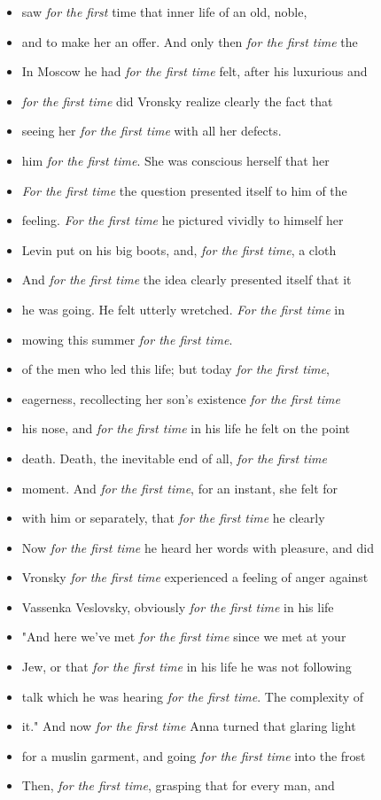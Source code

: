 \begin{tiny}
\begin{itemize}
\item saw \emph{for the first} time that inner life of an old, noble,
\item and to make her an offer.  And only then \emph{for the first time} the
\item In Moscow he had \emph{for the first time} felt, after his luxurious and
\item \emph{for the first time} did Vronsky realize clearly the fact that
\item seeing her \emph{for the first time} with all her defects.
\item him \emph{for the first time}.  She was conscious herself that her
\item \emph{For the first time} the question presented itself to him of the
\item feeling.  \emph{For the first time} he pictured vividly to himself her
\item Levin put on his big boots, and, \emph{for the first time}, a cloth
\item And \emph{for the first time} the idea clearly presented itself that it
\item he was going.  He felt utterly wretched.  \emph{For the first time} in
\item mowing this summer \emph{for the first time}.
\item of the men who led this life; but today \emph{for the first time},
\item eagerness, recollecting her son's existence \emph{for the first time}
\item his nose, and \emph{for the first time} in his life he felt on the point
\item death.  Death, the inevitable end of all, \emph{for the first time}
\item moment.  And \emph{for the first time}, for an instant, she felt for
\item with him or separately, that \emph{for the first time} he clearly
\item Now \emph{for the first time} he heard her words with pleasure, and did
\item Vronsky \emph{for the first time} experienced a feeling of anger against
\item Vassenka Veslovsky, obviously \emph{for the first time} in his life
\item "And here we've met \emph{for the first time} since we met at your
\item Jew, or that \emph{for the first time} in his life he was not following
\item talk which he was hearing \emph{for the first time}.  The complexity of
\item it."  And now \emph{for the first time} Anna turned that glaring light
\item for a muslin garment, and going \emph{for the first time} into the frost
\item Then, \emph{for the first time}, grasping that for every man, and
\end{itemize}
\end{tiny}
